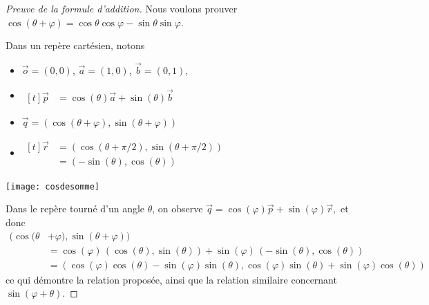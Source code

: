 \documentclass[french,xcolor=svgnames]{beamer}
\begin{document}
\begin{frame}
  \begin{proof}[Preuve de la formule d'addition]
    Nous voulons prouver
    \begin{math}
      \cos (\theta + \varphi) = \cos \theta \cos \varphi - \sin \theta \sin \varphi.
    \end{math}\par\pause
    \begin{minipage}{0.66\linewidth}
      Dans un repère cartésien, notons\pause{}
      \begin{itemize}
      \item \(\vec{o} = (0,0)\),\pause{} \(\vec{a} = (1,0)\),\pause{} \(\vec{b} = (0,1)\),\pause{}
      \item \(
        \begin{aligned}[t]
          \vec{p} &= %
          \cos(\theta) \vec{a} + \sin(\theta) \vec{b}
        \end{aligned}\)\pause{}
      \item \(\vec{q} = (\cos(\theta + \varphi),\sin(\theta + \varphi))\)\pause{}
      \item \(
        \begin{aligned}[t]
          \vec{r} &= (\cos(\theta + \pi/2),\sin(\theta + \pi/2))\\
          &= (-\sin(\theta),\cos(\theta))
        \end{aligned}\)
      \end{itemize}\pause{}
    \end{minipage}
    \begin{minipage}{0.33\linewidth}
      \texttt{[image: cosdesomme]}
    \end{minipage}\pause

    Dans le repère tourné d'un angle \(\theta\), on observe\pause{}
    \begin{math}
      \vec{q} = \cos(\varphi) \vec{p} + \sin(\varphi)\vec{r},
    \end{math}\pause{}
    et donc\pause{}
    \begin{align*}
      (\cos(\theta& + \varphi),\sin(\theta + \varphi))\\
      &= \cos(\varphi) \, (\cos(\theta),\sin(\theta)) + \sin(\varphi) \, (-\sin(\theta),\cos(\theta))\\
      &= (\cos(\varphi) \cos(\theta) - \sin(\varphi) \sin(\theta), \cos(\varphi) \sin(\theta) + \sin(\varphi)\cos(\theta))
    \end{align*}
    ce qui démontre la relation proposée, ainsi que la relation similaire concernant \(\sin(\varphi+\theta)\).
  \end{proof}
\end{frame}
\end{document}
